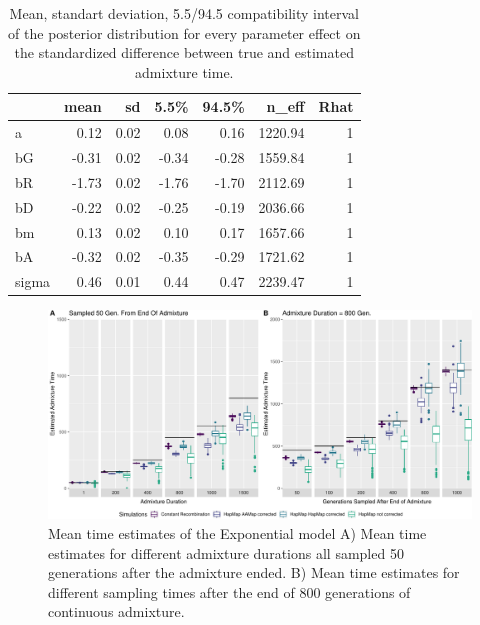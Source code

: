 \documentclass[]{article}
\begin{document}
\begin{table}[H]

\caption{\label{tab:tableS1}\label{tab:tableS1} Mean, standart deviation, 5.5/94.5 compatibility interval of the posterior distribution for every parameter effect on the standardized difference between true and estimated admixture time.}
\centering
\begin{tabular}{l|r|r|r|r|r|r}
\hline
  & mean & sd & 5.5\% & 94.5\% & n\_eff & Rhat\\
\hline
a & 0.12 & 0.02 & 0.08 & 0.16 & 1220.94 & 1\\
\cline{1-7}
bG & -0.31 & 0.02 & -0.34 & -0.28 & 1559.84 & 1\\
\cline{1-7}
bR & -1.73 & 0.02 & -1.76 & -1.70 & 2112.69 & 1\\
\cline{1-7}
bD & -0.22 & 0.02 & -0.25 & -0.19 & 2036.66 & 1\\
\cline{1-7}
bm & 0.13 & 0.02 & 0.10 & 0.17 & 1657.66 & 1\\
\cline{1-7}
bA & -0.32 & 0.02 & -0.35 & -0.29 & 1721.62 & 1\\
\cline{1-7}
sigma & 0.46 & 0.01 & 0.44 & 0.47 & 2239.47 & 1\\
\hline
\end{tabular}
\end{table}

\begin{figure}
\centering
\includegraphics{Admixture_Time_Inference_Paper_Draft_files/figure-latex/figS3-1.pdf}
\caption{\label{fig:figS2} Mean time estimates of the Exponential model A) Mean time estimates for different 
admixture durations all sampled 50 generations after the admixture ended. B) Mean time estimates for different sampling times after the end of 800
generations of continuous admixture.}
\end{figure}
\end{document}

